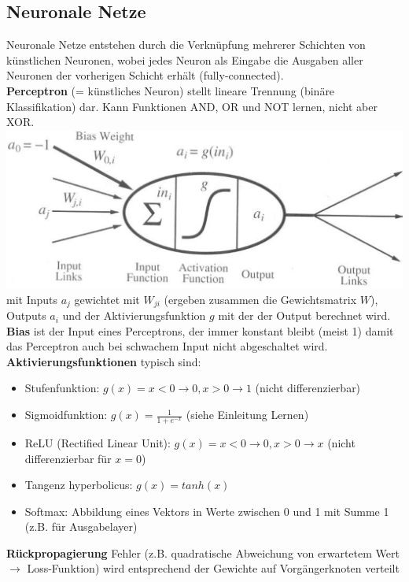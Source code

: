 \documentclass[12pt]{article}
\begin{document}
	\subsection{Neuronale Netze}
	Neuronale Netze entstehen durch die Verknüpfung mehrerer Schichten von künstlichen Neuronen, wobei jedes Neuron als Eingabe die Ausgaben aller Neuronen der vorherigen Schicht erhält (fully-connected).\\
	\textbf{Perceptron} (= künstliches Neuron) stellt lineare Trennung (binäre Klassifikation) dar. Kann Funktionen AND, OR und NOT lernen, nicht aber XOR.\\
	\includegraphics[width=\linewidth]{figures/perceptron.png}\\
	mit Inputs $a_j$ gewichtet mit $W_{ji}$ (ergeben zusammen die Gewichtsmatrix $W$), Outputs $a_i$ und der Aktivierungsfunktion $g$ mit der der Output berechnet wird.\\
	\textbf{Bias} ist der Input eines Perceptrons, der immer konstant bleibt (meist 1) damit das Perceptron auch bei schwachem Input nicht abgeschaltet wird.\\
	\textbf{Aktivierungsfunktionen} typisch sind:
	\begin{itemize}
		\item Stufenfunktion: $g(x) = x < 0 \rightarrow 0, x > 0 \rightarrow 1$ (nicht differenzierbar)
		\item Sigmoidfunktion: $g(x) = \frac{1}{1 + e^{-x}}$ (siehe Einleitung Lernen)
		\item ReLU (Rectified Linear Unit): $g(x) = x < 0 \rightarrow 0, x > 0 \rightarrow x$ (nicht differenzierbar für $x=0$)
		\item Tangenz hyperbolicus: $g(x) = tanh(x)$
		\item Softmax: Abbildung eines Vektors in Werte zwischen 0 und 1 mit Summe 1 (z.B. für Ausgabelayer)
	\end{itemize}
	\textbf{Rückpropagierung} Fehler (z.B. quadratische Abweichung von erwartetem Wert $\rightarrow$ Loss-Funktion) wird entsprechend der Gewichte auf Vorgängerknoten verteilt\\
\end{document}
